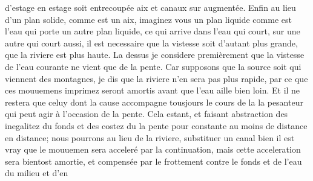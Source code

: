  d'estage en estage soit entrecoupée  aix\protect{} et canaux sur  augmentée. Enfin au lieu d'un plan solide, comme est un aix\protect{}, imaginez vous un plan liquide comme est l'eau qui porte un autre plan liquide, ce qui arrive dans l'eau qui court, sur une autre qui court aussi, il est necessaire que la vistesse soit d'autant plus grande, que la riviere est plus haute.
\pend 
\pstart
La dessus je considere premièrement que la vistesse de l'eau\protect{} courante ne vient que de la pente. Car supposons que la source soit  qui viennent des montagnes, je dis que la riviere n'en sera pas plus rapide, par ce que ces mouuemens imprimez seront amortis avant que l'eau aille bien loin. Et il ne restera que celuy dont la cause accompagne tousjours le cours de la  la pesanteur\protect{} qui peut agir à l'occasion de la pente. Cela estant, et faisant abstraction des inegalitez du fonds et des costez du  
 la pente pour constante au moins de distance en distance; nous pourrons au lieu de la riviere, substituer un canal bien  il est vray que le mouuemen sera acceleré par la continuation, mais cette acceleration\protect{} sera bientost amortie, et compensée par le frottement\protect{}  contre le fonds et de l'eau du milieu et d'en  

